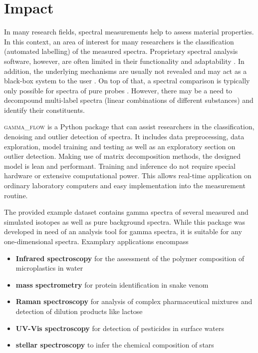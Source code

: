 \documentclass[review, 12pt, a4paper]{elsarticle}
\begin{document}
\section{Impact}
In many research fields, spectral measurements help to assess material properties. 
In this context, an area of interest for many researchers is the classification (automated labelling) of the measured spectra. Proprietary spectral analysis software, however, are often limited in their functionality and adaptability \cite{Lam2011, Nasereddin2023}. In addition, the underlying mechanisms are usually not revealed and may act as a black-box system to the user \cite{ElAmri2022}. On top of that, a spectral comparison is typically only possible for spectra of pure probes \cite{Cowger2021}. However, there may be a need to decompound multi-label spectra (linear combinations of different substances) and identify their constituents. 

\textsc{gamma\_flow} is a Python package that can assist researchers in the classification, denoising and outlier detection of spectra. It includes data preprocessing, data exploration, model training and testing as well as an exploratory section on outlier detection. Making use of matrix decomposition methods, the designed model is lean and performant. Training and inference do not require special hardware or extensive computational power. This allows real-time application on ordinary laboratory computers and easy implementation into the measurement routine. 

The provided example dataset contains gamma spectra of several measured and simulated isotopes as well as pure background spectra. While this package was developed in need of an analysis tool for gamma spectra, it is suitable for any one-dimensional spectra. Examplary applications encompass  
\begin{itemize}
\item \textbf{Infrared spectroscopy} for the assessment of the polymer composition of 
microplastics in water \cite{Ferreiro2023, Whiting2022}  
\item \textbf{mass spectrometry} for protein identification in snake venom 
\cite{Zelanis2019, Yasemin2021}  
\item \textbf{Raman spectroscopy} for analysis of complex pharmaceutical mixtures and detection of dilution products like lactose \cite{Fu2021}  
\item \textbf{UV-Vis spectroscopy} for detection of pesticides in surface waters \cite{Guo2020, Qi2024}
\item \textbf{stellar spectroscopy} to infer the chemical composition of stars \cite{Gray2021}  
\end{itemize}
\end{document}
